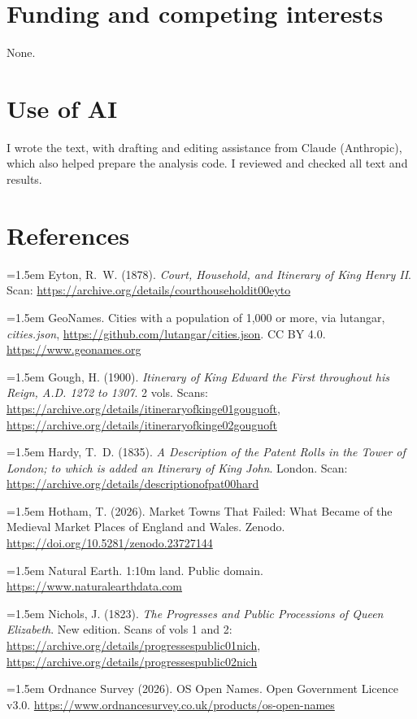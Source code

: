\documentclass[11pt,a4paper]{article}
\begin{document}
\section*{Funding and competing interests}

None.

\section*{Use of AI}

I wrote the text, with drafting and editing assistance from Claude (Anthropic), which also helped prepare the analysis code. I reviewed and checked all text and results.

\section*{References}
\setlength{\parskip}{0.35em}
\hangindent=1.5em Eyton, R.~W. (1878). \textit{Court, Household, and Itinerary of King Henry II}. Scan: \url{https://archive.org/details/courthouseholdit00eyto}

\hangindent=1.5em GeoNames. Cities with a population of 1,000 or more, via lutangar, \textit{cities.json}, \url{https://github.com/lutangar/cities.json}. CC BY 4.0. \url{https://www.geonames.org}

\hangindent=1.5em Gough, H. (1900). \textit{Itinerary of King Edward the First throughout his Reign, A.D. 1272 to 1307}. 2 vols. Scans: \url{https://archive.org/details/itineraryofkinge01gouguoft}, \url{https://archive.org/details/itineraryofkinge02gouguoft}

\hangindent=1.5em Hardy, T.~D. (1835). \textit{A Description of the Patent Rolls in the Tower of London; to which is added an Itinerary of King John}. London. Scan: \url{https://archive.org/details/descriptionofpat00hard}

\hangindent=1.5em Hotham, T. (2026). Market Towns That Failed: What Became of the Medieval Market Places of England and Wales. Zenodo. \url{https://doi.org/10.5281/zenodo.23727144}

\hangindent=1.5em Natural Earth. 1:10m land. Public domain. \url{https://www.naturalearthdata.com}

\hangindent=1.5em Nichols, J. (1823). \textit{The Progresses and Public Processions of Queen Elizabeth}. New edition. Scans of vols 1 and 2: \url{https://archive.org/details/progressespublic01nich}, \url{https://archive.org/details/progressespublic02nich}

\hangindent=1.5em Ordnance Survey (2026). OS Open Names. Open Government Licence v3.0. \url{https://www.ordnancesurvey.co.uk/products/os-open-names}
\end{document}

